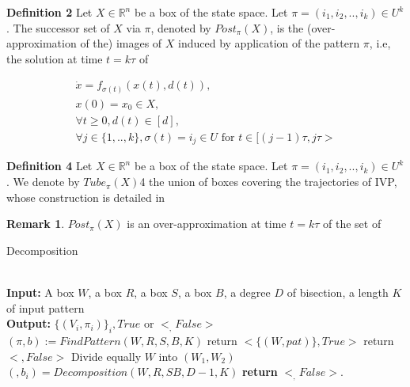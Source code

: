     \textbf{Definition 2} Let $X \in \mathbb{R}^n$ be a box of the state
    space. Let $\pi = (i_1,i_2,..,i_k) \in U^k$. The successor set of $X$
    via $\pi$, denoted by $Post_{\pi}(X)$, is the (over-approximation of the)
    images of $X$ induced by application of the pattern $\pi$, i.e, the 
    solution at time $t=k\tau$ of 

    \begin{eqnarray*}      
      \dot{x} = f_{\sigma(t)}(x(t),d(t)), \\
      x(0) = x_0 \in X, \\
      \forall t \geqslant 0, d(t) \in [d], \\
      \forall j \in \lbrace 1,..,k \rbrace, \sigma(t) = i_j \in U \text{ for } t \in [(j-1)\tau,j\tau>
    \end{eqnarray*}

    \textbf{Definition 4} Let $X \in \mathbb{R}^n$ be a box of the state
    space. Let $\pi = (i_1,i_2,..,i_k) \in U^k$. We denote by $Tube_{\pi}(X)$4
    the union  of boxes covering the trajectories of IVP, whose construction 
    is detailed in 
    
    \textbf{Remark 1}. $Post_{\pi}(X)$ is an over-approximation at time 
    $t=k\tau$ of the set of 

    \begin{algorithm}    
        \caption{Decomposition}\label{decomposition}    
        \begin{algorithmic}[1]
           \\
            \textbf{Input:} A box $W$, a box $R$, 
            a box $S$, a box $B$, a degree $D$ of bisection, a length $K$ of input pattern\\
            \textbf{Output:} $ \lbrace(V_i,\pi_i)\rbrace_i, True $ or $ <_,False>$ \\          
            $(\pi,b) := FindPattern(W,R,S,B,K)$
              \State return $<\lbrace (W,pat) \rbrace,True>$
            \Else
                \State return $<,False>$
              \Else
                \State Divide equally $W$ into $(W_1,W_2)$
                  \State $(,b_i) = Decomposition(W,R,SB,D-1,K)$
                \EndFor
              \EndIf
            \EndIf
            \State \textbf{return} $<_,False>$.
          \EndProcedure    
        \end{algorithmic}
      \end{algorithm}


